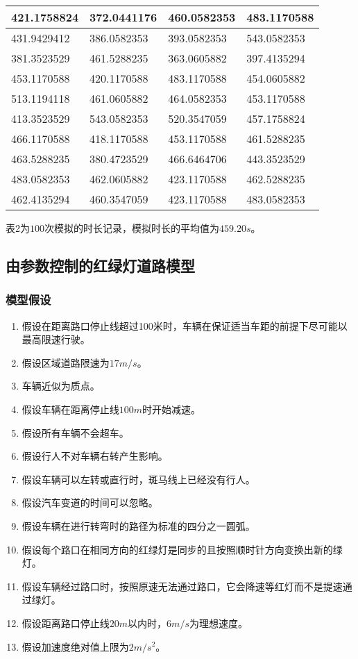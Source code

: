 \documentclass[a4paper,12pt]{article}
\numberwithin{equation}{section}
\begin{document}
\begin{table}[H]
\begin{tabular}{|l|l|l|l|}
		421.1758824 & 372.0441176 & 460.0582353 & 483.1170588 \\ \hline
		431.9429412 & 386.0582353 & 393.0582353 & 543.0582353 \\ \hline
		381.3523529 & 461.5288235 & 363.0605882 & 397.4135294 \\ \hline
		453.1170588 & 420.1170588 & 483.1170588 & 454.0605882 \\ \hline
		513.1194118 & 461.0605882 & 464.0582353 & 453.1170588 \\ \hline
		413.3523529 & 543.0582353 & 520.3547059 & 457.1758824 \\ \hline
		466.1170588 & 418.1170588 & 453.1170588 & 461.5288235 \\ \hline
		463.5288235 & 380.4723529 & 466.6464706 & 443.3523529 \\ \hline
		483.0582353 & 462.0605882 & 423.1170588 & 462.5288235 \\ \hline
		462.4135294 & 460.3547059 & 423.1170588 & 483.0582353 \\ \hline
	\end{tabular}
\end{table}
表2为$100$次模拟的时长记录，模拟时长的平均值为$459.20s$。
		\subsection{由参数控制的红绿灯道路模型}
			\subsubsection{模型假设}
		\begin{enumerate}
			\item 假设在距离路口停止线超过100米时，车辆在保证适当车距的前提下尽可能以最高限速行驶。
			\item 假设区域道路限速为$17m/s$。
			\item 车辆近似为质点。
			\item 假设车辆在距离停止线$100m$时开始减速。
			\item 假设所有车辆不会超车。
			\item 假设行人不对车辆右转产生影响。
			\item 假设车辆可以左转或直行时，斑马线上已经没有行人。
			\item 假设汽车变道的时间可以忽略。
			\item 假设车辆在进行转弯时的路径为标准的四分之一圆弧。
			\item 假设每个路口在相同方向的红绿灯是同步的且按照顺时针方向变换出新的绿灯。
			\item 假设车辆经过路口时，按照原速无法通过路口，它会降速等红灯而不是提速通过绿灯。
			\item 假设距离路口停止线$20m$以内时，$6m/s$为理想速度。
			\item 假设加速度绝对值上限为$2m/s^2$。
		\end{enumerate}
		
\end{document}
